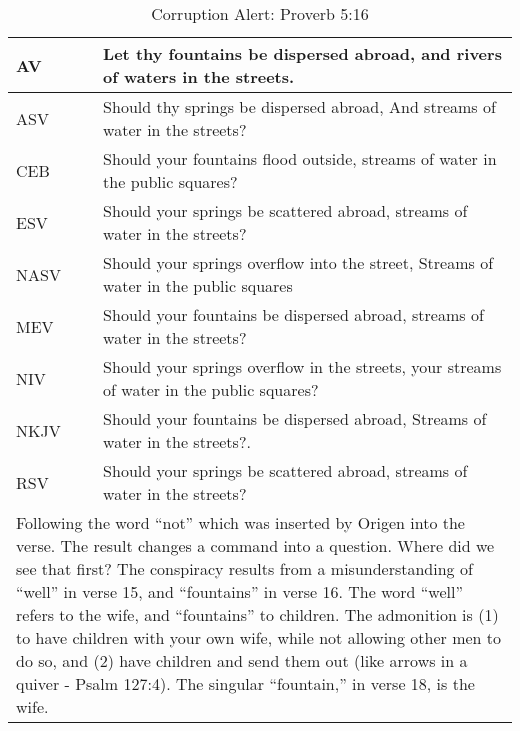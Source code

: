 \begin{center}

\begin{table}[ht]
\centering
\begin{tabular}{|p{.5in}|p{3.5in}|}
    \hline

\textcolor[rgb]{0.00,0.00,1.00}{AV} & \textcolor[rgb]{0.00,0.00,1.00}{Let thy fountains be dispersed abroad, and rivers of waters in the streets.} \\ \hline

ASV &  Should thy springs be dispersed abroad, And streams of water in the streets?\\ \hline

CEB &  Should your fountains flood outside, streams of water in the public squares?\\ \hline

ESV & Should your springs be scattered abroad, streams of water in the streets? \\ \hline

NASV & Should your springs overflow into the street, Streams of water in the public squares\\ \hline

MEV & Should your fountains be dispersed abroad, streams of water in the streets?\\ \hline

NIV &  Should your springs overflow in the streets, your streams of water in the public squares? \\ \hline

NKJV & Should your fountains be dispersed abroad, Streams of water in the streets?.\\ \hline

RSV & Should your springs be scattered abroad, streams of water in the streets?\\ \hline

 \multicolumn{2}{p{4.3in}}{{Following the word ``not'' which was inserted by Origen into the verse. The result changes a command into a question. Where did we see that first? The conspiracy results from a misunderstanding of ``well'' in verse 15, and ``fountains'' in verse 16. The word ``well'' refers to the wife, and ``fountains'' to children. The admonition is (1) to have children with your own wife, while not allowing other men to do so, and (2) have children and send them out (like arrows in a quiver - Psalm 127:4). The singular ``fountain,'' in verse 18, is the wife.}} \\
\end{tabular}
 
\caption[Corruption Alert: Proverb 5:16]{Corruption Alert: Proverb 5:16} \label{table:Corruption Proverb 5:16}
\end{table}

\end{center}


